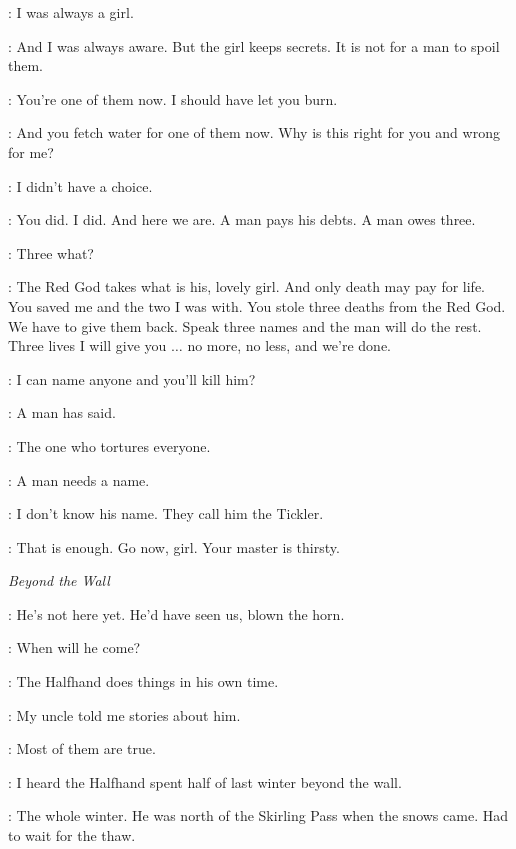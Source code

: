 \ARYA: I was always a girl. 

\JAQEN: And I was always aware. But the girl keeps secrets. It is not for a man to spoil them. 

\ARYA: You're one of them now. I should have let you burn. 

\JAQEN: And you fetch water for one of them now. Why is this right for you and wrong for me? 

\ARYA: I didn't have a choice. 

\JAQEN: You did. I did. And here we are. A man pays his debts. A man owes three. 

\ARYA: Three what? 

\JAQEN: The Red God takes what is his, lovely girl. And only death may pay for life. You saved me and the two I was with. You stole three deaths from the Red God. We have to give them back. Speak three names and the man will do the rest. Three lives I will give you $\ldots$ no more, no less, and we're done. 

\ARYA: I can name anyone and you'll kill him? 

\JAQEN: A man has said. 

\ARYA: The one who tortures everyone. 

\JAQEN: A man needs a name. 

\ARYA: I don't know his name. They call him the Tickler. 

\JAQEN: That is enough. Go now, girl. Your master is thirsty. 



\scene

\textit{Beyond the Wall} 


\JEOR: He's not here yet. He'd have seen us, blown the horn. 

\JON: When will he come? 

\JEOR: The Halfhand does things in his own time. 

\JON: My uncle told me stories about him. 

\JEOR: Most of them are true. 

\JON: I heard the Halfhand spent half of last winter beyond the wall. 

\JEOR: The whole winter. He was north of the Skirling Pass when the snows came. Had to wait for the thaw. 

